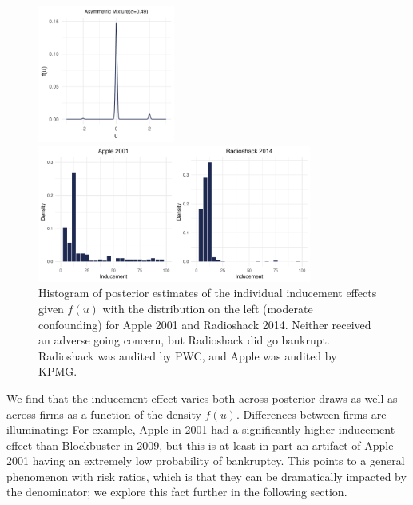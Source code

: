 \documentclass[aoas,preprint, 11pt, dvipsnames, table, x11name]{imsart}
\theoremstyle{remark}
\begin{document}
	\begin{figure}[!httb]
		\centering 
			\begin{minipage}{.3\textwidth}
			\includegraphics[width=4.5cm]{rightbump2_navy}
		\end{minipage}%
		\begin{minipage}{.5\textwidth}
			\includegraphics[width=9cm]{Apple_radioshack_right_RR_navy}
		\end{minipage}
	\caption[Apple vs Radioshack]{Histogram of posterior estimates of the individual inducement effects given $f(u)$ with the distribution on the left (moderate confounding) for Apple 2001 and Radioshack 2014.  Neither received an adverse going concern, but Radioshack did go bankrupt. Radioshack was audited by PWC, and Apple was audited by KPMG.}
		\label{individ_firm_plot}
	\end{figure}
	We find that the inducement effect varies both across posterior draws as well as across firms as a function of the density $f(u)$.  Differences between firms are illuminating: For example, Apple in 2001 had a significantly higher inducement effect than Blockbuster in 2009, but this is at least in part an artifact of Apple 2001 having an extremely low probability of bankruptcy. This points to a general phenomenon with risk ratios, which is that they can be dramatically impacted by the denominator; we explore this fact further in the following section.
	
\end{document}

